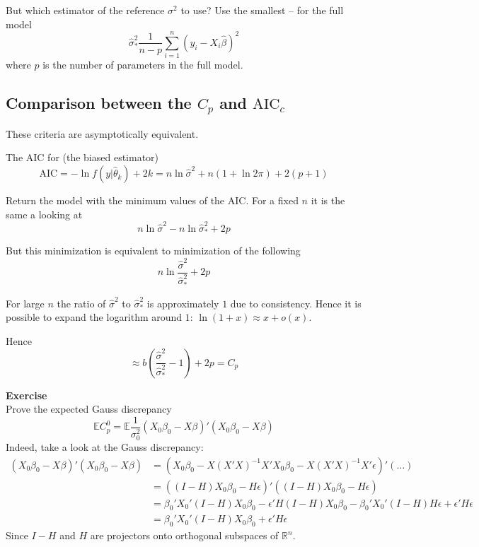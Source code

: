 \documentclass[a4paper]{article}
\newcommand{\brac}[1]{{\left ( #1 \right )}}
\newcommand{\induc}[1]{{\left . #1 \right \vert}}
\newcommand{\Real}{\mathbb{R}}
\newcommand{\Ex}[0]{{\mathbb{E}}}
\begin{document}
But which estimator of the reference $\sigma^2$ to use? Use the smallest -- for the full model
\[\hat{\sigma}^2_*\frac{1}{n-p} \sum_{i=1}^n\brac{y_i - X_i\hat{\beta}}^2\]
where $p$ is the number of parameters in the full model.


\subsection{Comparison between the $C_p$ and $\text{AIC}_c$} %
\label{sub:comparison_between_cp_and_aicc}

These criteria are asymptotically equivalent.

The AIC for (the biased estimator)
\[\text{AIC} = - \ln f\brac{\induc{y}\hat{\theta}_k} + 2k 
	= n \ln \hat{\sigma}^2 + n\brac{1 + \ln 2\pi} + 2(p+1)\]

Return the model with the minimum values of the AIC. For a fixed $n$ it is the same a looking at 
\[n\ln \hat{\sigma}^2 - n\ln \hat{\sigma}^2_* + 2 p \]

But this minimization is equivalent to minimization of the following 
\[ n\ln \frac{\hat{\sigma}^2}{\hat{\sigma}^2_*} + 2p\]

For large $n$ the ratio of $\hat{\sigma}^2$ to $\hat{\sigma}^2_*$ is approximately $1$ due to consistency.
Hence it is possible to expand the logarithm around $1$: $\ln(1+x)\approx x + o(x)$.

Hence
\[\approx b\brac{\frac{\hat{\sigma}^2}{\hat{\sigma}^2_*} - 1} + 2p = C_p\]

\textbf{Exercise}\\
Prove the expected Gauss discrepancy
\[\Ex C_p^0 = \Ex \frac{1}{\sigma^2_0}\brac{X_0\beta_0 -X \beta}'\brac{X_0\beta_0 -X \beta}\]
Indeed, take a look at the Gauss discrepancy:
\begin{align*}
	\brac{X_0\beta_0 -X \beta}'\brac{X_0\beta_0 -X \beta} &= \brac{X_0\beta_0 - X \brac{X'X}^{-1}X'X_0\beta_0 - X \brac{X'X}^{-1}X'\epsilon }'\brac{ \ldots }\\
	&= \brac{ (I - H )X_0\beta_0 - H \epsilon }'\brac{ (I - H )X_0\beta_0 - H \epsilon }\\
	&= \beta_0'X_0'(I-H)X_0\beta_0 - \epsilon'H(I-H)X_0\beta_0 - \beta_0'X_0'(I-H)H \epsilon + \epsilon'H\epsilon\\
	&= \beta_0'X_0'(I-H)X_0\beta_0 + \epsilon'H\epsilon
\end{align*}
Since $I-H$ and $H$ are projectors onto orthogonal subspaces of $\Real^n$.
\end{document}
